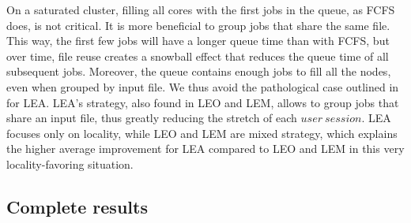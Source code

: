 \documentclass[conference]{IEEEtran}
\newcommand{\us}{\ensuremath{\mathit{user~session}}\xspace}
\newcommand{\rev}[1]{{\color{black}{#1}}}
\begin{document}

On a saturated cluster, filling all cores with the first jobs in the queue, as FCFS does, is not critical.
It is more beneficial to group jobs that share the same file.
This way, the first few jobs will have a longer queue time than with FCFS, but over time, file reuse creates a snowball effect that reduces the queue time of all subsequent jobs.
Moreover, the queue contains enough jobs to fill all the nodes, even when grouped by input file.
We thus avoid the pathological case outlined in \rev{Section~\ref{sec.40}} for LEA.
LEA's strategy, also found in LEO and LEM, allows to group jobs that share an input file, thus greatly reducing the stretch of each \us.
LEA focuses only on locality, while LEO and LEM are mixed strategy, which explains the higher average improvement for LEA compared to LEO and LEM in this very locality-favoring situation.



\subsection{Complete results}
\end{document}
